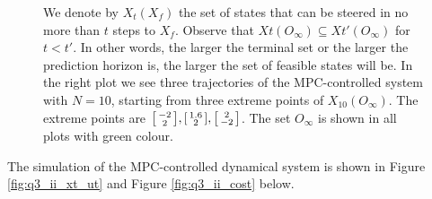 \documentclass[a4paper,11pt,reqno]{amsart}
\begin{document}
\begin{figure}[H]
    \centering
    \vspace{-0.35cm}
    \subfigtopskip=-2pt
    \subfigbottomskip=2pt
    \subfigcapskip=-5pt
    \caption{We denote by $X_t(X_f)$ the set of states that can be steered in no more than $t$
    steps to $X_f$. Observe that $Xt(O_{\infty})\subseteq Xt'(O_{\infty})$ for $t < t'$. In
    other words, the larger the terminal set or the larger the prediction horizon is, the larger
    the set of feasible states will be. In the right plot we see three trajectories of the
    MPC-controlled system with $N = 10$, starting from three extreme points of $X_{10}(O_\infty)$. The extreme points are $\begin{bsmallmatrix}-2\\2\end{bsmallmatrix}, \begin{bsmallmatrix}1.6\\2\end{bsmallmatrix}, \begin{bsmallmatrix}2\\-2\end{bsmallmatrix}$. The set
    $O_{\infty}$ is shown in all plots with green colour.}
    \label{fig:q3_ii_Xx}
\end{figure}
The simulation of the MPC-controlled dynamical system is shown in Figure \ref{fig:q3_ii_xt_ut} and Figure \ref{fig:q3_ii_cost} below.
\end{document}
